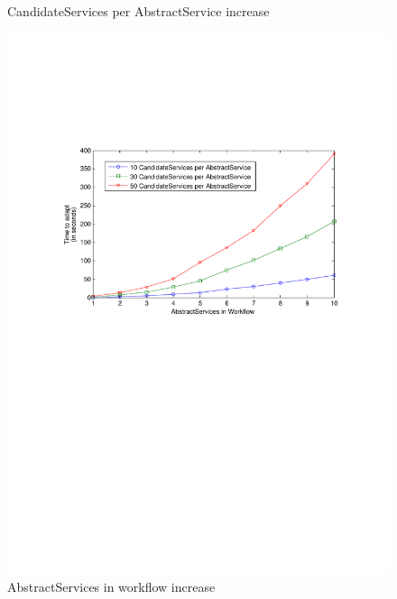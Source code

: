 \documentclass[10pt,journal,compsoc]{IEEEtran}
\begin{document}
\begin{figure}[htbp]
\begin{minipage}[b]{0.4\linewidth}
	\caption{CandidateServices per AbstractService increase \label{fig:task_per_svc}}
	\end{minipage}
	\hspace{0.7cm}
	\begin{minipage}[b]{0.4\linewidth}
			\includegraphics[clip, trim=2cm 14cm 2cm 6cm, scale=0.3]{graphs/10_30_50_svc_per_task_scaling.pdf}
			\caption{AbstractServices in workflow increase\label{fig:svc_per_task}}
	\end{minipage}
\end{figure}
\end{document}
